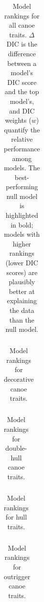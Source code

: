 \documentclass[11pt]{article}
\begin{document}
\begin{table}
\begin{center}
\begin{tabular}{lllll}

\end{tabular}
\end{center}
\caption{Model rankings for all canoe traits. $\Delta$ DIC is the difference between a model's DIC score and the top model's, and DIC weights ($w$) quantify the relative performance among models. The best-performing null model is highlighted in bold; models with higher rankings (lower DIC scores) are plausibly better at explaining the data than the null model.}
\label{tab:modelComparisonsAllTraits}
\end{table}

\begin{table}
\begin{center}
\begin{tabular}{lllll}

\end{tabular}
\end{center}
\caption{Model rankings for decorative canoe traits.}
\label{tab:modelComparisonsDecorative}
\end{table}

\begin{table}
\begin{center}
\begin{tabular}{lllll}

\end{tabular}
\end{center}
\caption{Model rankings for double-hull canoe traits.}
\label{tab:modelComparisonsDouble}
\end{table}

\begin{table}
\begin{center}
\begin{tabular}{lllll}

\end{tabular}
\end{center}
\caption{Model rankings for hull traits.}
\label{tab:modelComparisonsHull}
\end{table}

\begin{table}
\begin{center}
\begin{tabular}{lllll}

\end{tabular}
\end{center}
\caption{Model rankings for outrigger canoe traits.}
\label{tab:modelComparisonsOutrigger}
\end{table}
\end{document}
